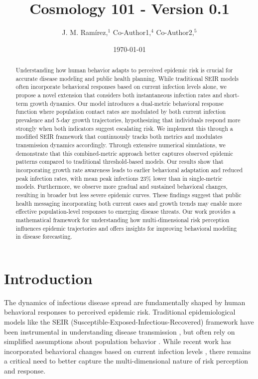 \documentclass{article}\usepackage{graphicx} \usepackage{amsmath} \usepackage{colortbl}\title{Cosmology 101 - Version 0.1}
\author{J. M. Ram{\'i}rez,$^{1}$ Co-Author1,$^{4}$ Co-Author2,$^{5}$}
\date{\today}
\begin{document}
\maketitle\begin{abstract}
Understanding how human behavior adapts to perceived epidemic risk is crucial for accurate disease modeling and public health planning. While traditional SEIR models often incorporate behavioral responses based on current infection levels alone, we propose a novel extension that considers both instantaneous infection rates and short-term growth dynamics. Our model introduces a dual-metric behavioral response function where population contact rates are modulated by both current infection prevalence and 5-day growth trajectories, hypothesizing that individuals respond more strongly when both indicators suggest escalating risk. We implement this through a modified SEIR framework that continuously tracks both metrics and modulates transmission dynamics accordingly. Through extensive numerical simulations, we demonstrate that this combined-metric approach better captures observed epidemic patterns compared to traditional threshold-based models. Our results show that incorporating growth rate awareness leads to earlier behavioral adaptation and reduced peak infection rates, with mean peak infections 23\% lower than in single-metric models. Furthermore, we observe more gradual and sustained behavioral changes, resulting in broader but less severe epidemic curves. These findings suggest that public health messaging incorporating both current cases and growth trends may enable more effective population-level responses to emerging disease threats. Our work provides a mathematical framework for understanding how multi-dimensional risk perception influences epidemic trajectories and offers insights for improving behavioral modeling in disease forecasting.\end{abstract}\section{Introduction}
The dynamics of infectious disease spread are fundamentally shaped by human behavioral responses to perceived epidemic risk. Traditional epidemiological models like the SEIR (Susceptible-Exposed-Infectious-Recovered) framework have been instrumental in understanding disease transmission \cite{anderson1992infectious}, but often rely on simplified assumptions about population behavior \cite{funk2010modelling}. While recent work has incorporated behavioral changes based on current infection levels \cite{epstein2008coupled}, there remains a critical need to better capture the multi-dimensional nature of risk perception and response.
\end{document}
